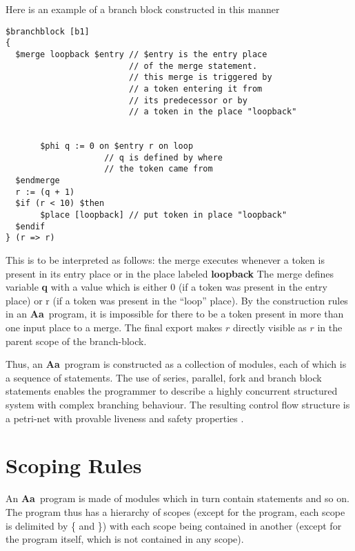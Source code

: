 \documentclass{article}
\newcommand{\Aa}{{\bf Aa}~}
\begin{document}
\begin{itemize}
Here is an example of a branch block constructed in this manner
\begin{verbatim}
$branchblock [b1] 
{
  $merge loopback $entry // $entry is the entry place
                         // of the merge statement.
                         // this merge is triggered by
                         // a token entering it from
                         // its predecessor or by  
                         // a token in the place "loopback"


       $phi q := 0 on $entry r on loop 
                    // q is defined by where 
                    // the token came from
  $endmerge
  r := (q + 1)
  $if (r < 10) $then 
       $place [loopback] // put token in place "loopback"
  $endif
} (r => r)
\end{verbatim}%
This is to be interpreted as follows: the merge executes
whenever a token is present in its entry place  or in 
the place labeled {\bf loopback}
The merge defines variable {\bf q} with a value which is
either 0 (if a token was present in the entry place)
or r (if a token was present in the ``loop'' place).
By the construction rules in an \Aa program, it is
impossible for there to be a token present in more
than one input place to a merge.  The final export
makes $r$ directly visible as $r$  in the parent scope of the
branch-block.
\end{itemize}

Thus, an \Aa program is constructed as a collection of modules,
each of which is a sequence of statements.  The use of series,
parallel, fork and branch block
statements enables the programmer to describe a highly concurrent
structured system with complex branching behaviour.  
The resulting control flow structure is a
petri-net with provable liveness and safety properties \cite{ref:SameerPhD}.

\section{Scoping Rules} \label{sec:Scopes}

An \Aa program is made of modules which in turn contain statements
and so on.  The program thus has a hierarchy of scopes 
(except for the program, each scope is delimited by \{ and \}) with each
scope being contained in another (except for the program itself,
which is not contained in any scope).
\end{document}
